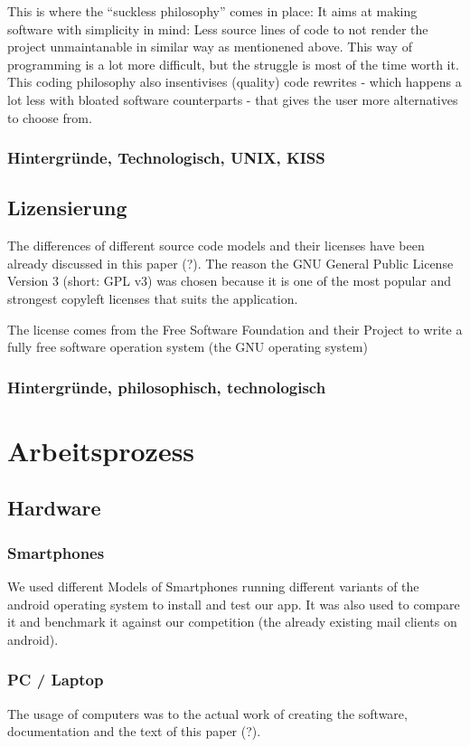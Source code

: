 \documentclass[a4paper,11pt]{article}
\begin{document}
This is where the ``suckless philosophy'' comes in place: It aims at making software with simplicity in mind: Less source lines of code to not render the project unmaintanable in similar way as mentionened above. This way of programming is a lot more difficult, but the struggle is most of the time worth it. This coding philosophy also insentivises (quality) code rewrites - which happens a lot less with bloated software counterparts - that gives the user more alternatives to choose from.

\subsubsection{Hintergründe, Technologisch, UNIX, KISS}
\subsection{Lizensierung}
The differences of different source code models and their licenses have been already discussed in this paper (?). The reason the GNU General Public License Version 3 (short: GPL v3) was chosen because it is one of the most popular and strongest copyleft licenses that suits the application.

The license comes from the Free Software Foundation and their Project to write a fully free software operation system (the GNU operating system)

\subsubsection{Hintergründe, philosophisch, technologisch}

\section{Arbeitsprozess}

\subsection{Hardware}

\subsubsection{Smartphones}
We used different Models of Smartphones running different variants of the android operating system to install and test our app. It was also used to compare it and benchmark it against our competition (the already existing mail clients on android).
\subsubsection{PC / Laptop}
The usage of computers was to the actual work of creating the software, documentation and the text of this paper (?).
\end{document}
